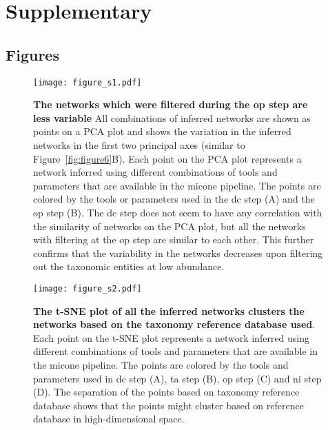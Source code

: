 
\newpage
\section*{Supplementary}

  \renewcommand{\thefigure}{S\arabic{figure}}
  \setcounter{figure}{0}

  \renewcommand{\thetable}{S\arabic{table}}
  \setcounter{table}{0}

  

  \subsection*{Figures}

    \begin{figure}[H]
      \centering
      \texttt{[image: figure\_s1.pdf]}
    \end{figure}
    \begin{figure}[H]
      \centering
        \caption{
          \textbf{The networks which were filtered during the \ac{op} step are less variable}
          All combinations of inferred networks are shown as points on a PCA plot and shows the variation in the inferred networks in the first two principal axes (similar to Figure~\ref{fig:figure6}B).
          Each point on the PCA plot represents a network inferred using different combinations of tools and parameters that are available in the \ac{micone} pipeline.
          The points are colored by the tools or parameters used in the \ac{dc} step (A) and the \ac{op} step (B).
          The \ac{dc} step does not seem to have any correlation with the similarity of networks on the PCA plot, but all the networks with filtering at the \ac{op} step are similar to each other.
          This further confirms that the variability in the networks decreases upon filtering out the taxonomic entities at low abundance.
        }
      \label{fig:figure_s1}
    \end{figure}
    \FloatBarrier
    \newpage

    \begin{figure}[H]
      \centering
      \texttt{[image: figure\_s2.pdf]}
    \end{figure}
    \begin{figure}[H]
      \centering
        \caption{
          \textbf{The t-SNE plot of all the inferred networks clusters the networks based on the taxonomy reference database used}.
          Each point on the t-SNE plot represents a network inferred using different combinations of tools and parameters that are available in the \ac{micone} pipeline.
          The points are colored by the tools and parameters used in \ac{dc} step (A), \ac{ta} step (B), \ac{op} step (C) and \ac{ni} step (D).
          The separation of the points based on taxonomy reference database shows that the points might cluster based on reference database in high-dimensional space.
        }
      \label{fig:figure_s2}
    \end{figure}
    \FloatBarrier
    \newpage

